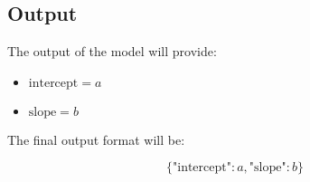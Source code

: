 \documentclass{article}
\begin{document}
\subsection*{Output}

The output of the model will provide:

\begin{itemize}
    \item \( \text{intercept} = a \)
    \item \( \text{slope} = b \)
\end{itemize}

The final output format will be:

\[
\{
    \text{"intercept"}: a,
    \text{"slope"}: b
\}
\]
\end{document}

